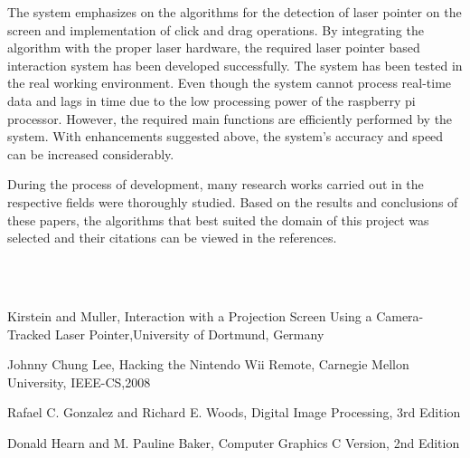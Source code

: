 \documentclass[12pt, a4paper]{article}
\begin{document}
   The system emphasizes on the algorithms for the detection of laser pointer on the screen and implementation of click  and drag operations. By integrating the algorithm with the proper laser hardware, the required laser pointer based interaction system has been developed successfully. The system has been tested in the real working environment. Even though the system cannot process real-time data and lags in time due to the low processing power of the raspberry pi processor. However, the required main functions are efficiently performed by the system. With enhancements suggested above, the system's accuracy and speed can be increased considerably. 
   
   During the process of development, many research works carried out in the respective fields were thoroughly studied. Based on the results and conclusions of these papers, the algorithms that best suited the domain of this project was selected and their citations can be viewed in the references.
   
   
\newpage
\renewcommand{\refname}{REFERENCES}
~\\
~\\
\begin{thebibliography}{}
	 Kirstein and Muller, Interaction with a Projection Screen Using a Camera-Tracked Laser Pointer,University of Dortmund, Germany 
	

	 Johnny Chung Lee, Hacking the Nintendo Wii Remote, Carnegie 		   Mellon University, IEEE-CS,2008 

	
	 Rafael C. Gonzalez and Richard E. Woods, Digital Image Processing, 3rd Edition
	
	 Donald Hearn and M. Pauline Baker, Computer Graphics C Version, 2nd Edition 
\end{thebibliography}
\end{document}
